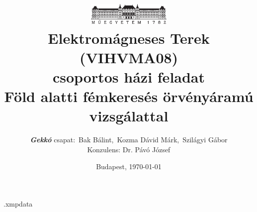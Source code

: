\begin{filecontents*}[overwrite]{\jobname.xmpdata}
    \Title{}
\end{filecontents*}

\documentclass[a4paper,12pt,oneside]{article}
\usepackage{ucs}
\usepackage[T1]{fontenc}
\usepackage[utf8]{inputenc}
\usepackage[magyar]{babel}
\usepackage{amsfonts}
\usepackage{amsmath,bm}
\usepackage{pdfpages}
\usepackage{amssymb}
\usepackage{graphicx}
\usepackage[hang]{caption}
\usepackage[left=10mm,right=10mm,top=10mm,bottom=10mm]{geometry}
\usepackage{hyperref}
\usepackage[range-phrase=--, range-units=single]{siunitx}
\usepackage{xcolor}
\usepackage[a-3u]{pdfx}

\sloppy %
\def\hyph{-\penalty0\hskip0pt\relax} %

\pagestyle{plain} 
\nopagebreak

\title{
    \centering
    \vspace{-0.8cm}
    \includegraphics[width=0.3\textwidth]{kep/bme_logo.pdf} \\
    \textbf{Elektromágneses Terek (VIHVMA08)\\
    csoportos házi feladat} \\[2ex]
    Föld alatti fémkeresés örvényáramú vizsgálattal
    \vspace{0.1cm}
}


\newcommand\adj[1]{#1^{\mathrm{H}}}

\author{\emph{\textbf{Gekkó}} csapat:~Bak Bálint,~Kozma Dávid Márk,~Szilágyi Gábor \\[2ex]
    Konzulens: Dr. Pávó József}
\date{Budapest, \today}



